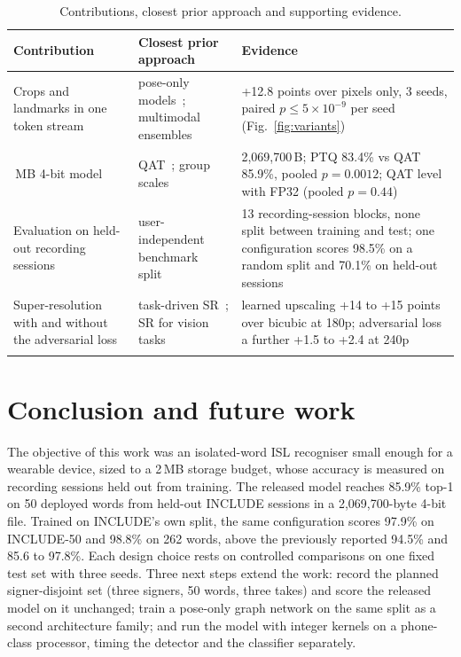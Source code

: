 \documentclass[pdflatex,sn-mathphys-num,twocolumn]{sn-jnl}
\newlength\origtw
\newenvironment{widetable}[1][tbp]{\begin{table}[#1]\centering\begin{minipage}{\origtw}\setlength\textwidth{\origtw}\setlength\columnwidth{\origtw}\begin{center}\begin{threeparttable}\tablebodyfont\renewcommand\footnotetext[2][]{{\removelastskip\vskip3pt\let\tablebodyfont\tablefootnotefont\hskip0pt\if!##1!\else{\smash{$^{##1}$}}\fi##2\par}}}{\end{threeparttable}\end{center}\end{minipage}\end{table}}
\theoremstyle{thmstyleone}%
\begin{document}
\begin{widetable}[t]
\caption{Contributions, closest prior approach and supporting evidence.}\label{tab:contrib}
\scriptsize
\setlength{\tabcolsep}{3pt}
\begin{tabularx}{\textwidth}{@{}L{3.0cm}L{3.6cm}Y@{}}
\toprule
Contribution & Closest prior approach & Evidence \\
\midrule
Crops and landmarks in one token stream & pose-only models~\cite{selvaraj2022openhands,bohacek2022spoter}; multimodal ensembles~\cite{jiang2021samslr} & +12.8 points over pixels only, 3 seeds, paired $p\le5\times10^{-9}$ per seed (Fig.~\ref{fig:variants}) \\\,MB 4-bit model & QAT~\cite{jacob2018quant}; group scales~\cite{shen2020qbert,frantar2023gptq} & 2,069,700\,B; PTQ 83.4\% vs QAT 85.9\%, pooled $p=0.0012$; QAT level with FP32 (pooled $p=0.44$) \\\addlinespace[2.5pt]
Evaluation on held-out recording sessions & user-independent benchmark split~\cite{sincan2020autsl} & 13 recording-session blocks, none split between training and test; one configuration scores 98.5\% on a random split and 70.1\% on held-out sessions \\\addlinespace[2.5pt]
Super-resolution with and without the adversarial loss & task-driven SR~\cite{haris2018taskdriven}; SR for vision tasks~\cite{dai2016srhelpful} & learned upscaling +14 to +15 points over bicubic at 180p; adversarial loss a further +1.5 to +2.4 at 240p \\
\botrule
\end{tabularx}
\end{widetable}

\section{Conclusion and future work}\label{sec:conclusion}

The objective of this work was an isolated-word ISL recogniser small enough for a wearable device, sized to a 2\,MB storage budget, whose accuracy is measured on recording sessions held out from training. The released model reaches 85.9\% top-1 on 50 deployed words from held-out INCLUDE sessions in a 2,069,700-byte 4-bit file. Trained on INCLUDE's own split, the same configuration scores 97.9\% on INCLUDE-50 and 98.8\% on 262 words, above the previously reported 94.5\% and 85.6 to 97.8\%. Each design choice rests on controlled comparisons on one fixed test set with three seeds. Three next steps extend the work: record the planned signer-disjoint set (three signers, 50 words, three takes) and score the released model on it unchanged; train a pose-only graph network on the same split as a second architecture family; and run the model with integer kernels on a phone-class processor, timing the detector and the classifier separately.
\end{document}
